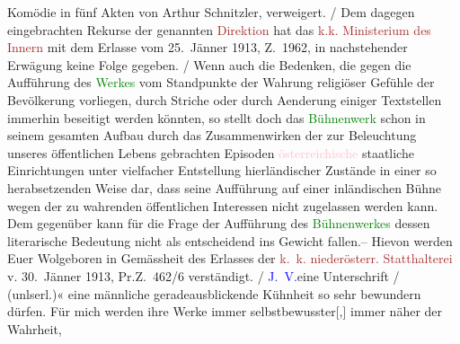 {{{                        Komödie in fünf Akten von Arthur Schnitzler, verweigert.{ / }Dem dagegen eingebrachten Rekurse der genannten \textcolor{brown}{Direktion} hat das \textcolor{brown}{k.k. Ministerium des Innern} mit dem Erlasse vom
                           25. Jänner 1913, Z. 1962, in nachstehender Erwägung keine
                        Folge gegeben.{ / }Wenn auch die Bedenken, die gegen die Aufführung
                        des \textcolor{green}{Werkes} vom
                        Standpunkte der Wahrung religiöser Gefühle der Bevölkerung vorliegen, durch
                        Striche oder durch Aenderung einiger Textstellen immerhin beseitigt werden
                        könnten, so stellt doch das \textcolor{green}{Bühnenwerk} schon in seinem gesamten Aufbau durch
                        das Zusammenwirken der zur Beleuchtung unseres öffentlichen Lebens
                        gebrachten Episoden \textcolor{pink}{österreichische}
                        staatliche Einrichtungen unter vielfacher Entstellung hierländischer
                        Zustände in einer so herabsetzenden Weise dar, dass seine Aufführung auf
                        einer inländischen Bühne wegen der zu wahrenden öffentlichen Interessen
                        nicht zugelassen werden kann. Dem gegenüber kann für die Frage der
                        Aufführung des \textcolor{green}{Bühnenwerkes} dessen
                        literarische Bedeutung nicht als entscheidend ins Gewicht fallen.– Hievon
                        werden Euer Wolgeboren in Gemässheit des Erlasses der \textcolor{brown}{k. k. niederösterr. Statthalterei} v.
                           30. Jänner 1913, Pr.Z. 462/6 verständigt.{ / }\textcolor{blue}{J. V.}eine Unterschrift{ / }(unlserl.)«}}}\label{K_L03641-1} eine männliche geradeausblickende Kühnheit so sehr bewundern
               dürfen. Für mich werden ihre Werke immer selbstbewusster{[},{]} immer näher der Wahrheit,
